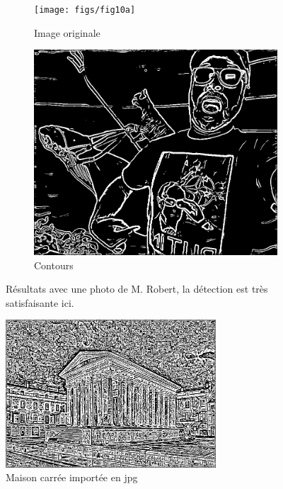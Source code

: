 \documentclass[hidelinks,11pt]{article}
\theoremstyle{mytheoremstyle}
\theoremstyle{mytheoremstyle}
\theoremstyle{myproblemstyle}
\begin{document}
    \newpage
    \begin{figure}[t]
        \centering
        \begin{subfigure}[b]{0.4\textwidth}
            \centering
            \texttt{[image: figs/fig10a]}
            \caption{Image originale}
        \end{subfigure}
        \hfill
        \begin{subfigure}[b]{0.4\textwidth}
            \centering
            \includegraphics[width=\textwidth]{figs/fig10b}
            \caption{Contours}
        \end{subfigure}
           \caption{Résultats avec une photo de M. Robert, la détection est très satisfaisante ici.}
    \end{figure}
    
    \begin{figure}[h]
        \centering
        \includegraphics[width=0.7\textwidth]{figs/fig11}
        \caption{Maison carrée importée en jpg}
    \end{figure}
\end{document}
